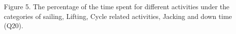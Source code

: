 Figure 5. The percentage of the time spent for different activities under the categories of sailing, Lifting, Cycle related activities, Jacking and down time (Q20).